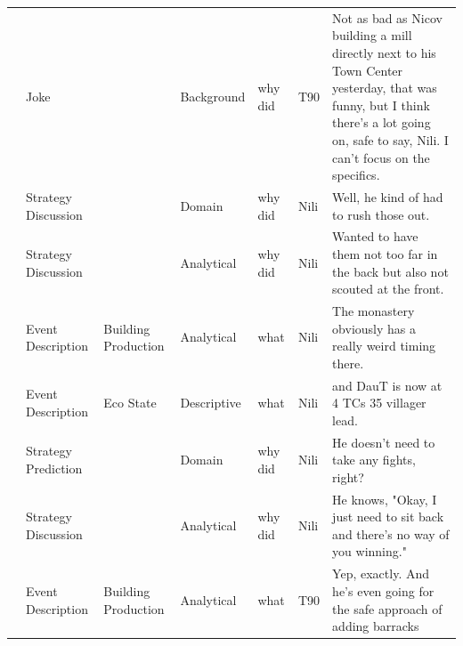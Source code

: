 {\begin{longtable}{@{}>{\theAppRow}r|L{2.3cm}L{2.2cm}L{1.4cm}L{2.2cm}L{0.5cm}U{5.6cm}@{}}
    & Joke                  &                      & Background  & why did           & T90     & Not as bad as Nicov building a mill directly next to his Town Center yesterday, that was funny, but I think there's a lot going on, safe to say, Nili. I can't focus on the specifics.                                   \\
    & Strategy Discussion   &                      & Domain      & why did           & Nili    & Well, he kind of had to rush those out.                                                                                                                                                                                  \\
    & Strategy Discussion   &                      & Analytical  & why did           & Nili    & Wanted to have them not too far in the back but also not scouted at the front.                                                                                                                                           \\
    & Event Description     & Building Production  & Analytical  & what              & Nili    & The monastery obviously has a really weird timing there.                                                                                                                                                                 \\
    & Event Description     & Eco State            & Descriptive   & what              & Nili    & and DauT is now at 4 TCs 35 villager lead.                                                                                                                                                                               \\
    & Strategy Prediction   &                      & Domain      & why did           & Nili    & He doesn't need to take any fights, right?                                                                                                                                                                               \\
    & Strategy Discussion   &                      & Analytical  & why did           & Nili    & He knows, "Okay, I just need to sit back and there's no way of you winning."                                                                                                                                             \\
    & Event Description     & Building Production  & Analytical  & what              & T90     & Yep, exactly. And he's even going for the safe approach of adding barracks                                                                                                                                               \\

\end{longtable}}
